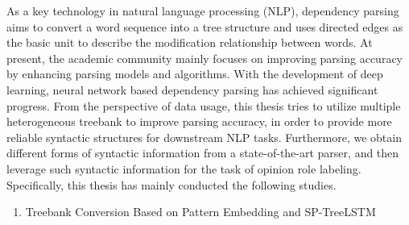 
\begin{eabstract}



    As a key technology in natural language processing (NLP), dependency parsing aims to convert a word sequence into a tree structure and uses directed edges as the basic unit to describe the modification relationship between words.
    At present, the academic community mainly focuses on improving parsing accuracy  by enhancing parsing models and algorithms. With the development of deep learning, neural network based dependency parsing has achieved significant progress.
    From the perspective of data usage, this thesis tries to utilize multiple heterogeneous treebank to improve parsing accuracy,  in order to provide more reliable syntactic structures for downstream NLP  tasks.
    Furthermore, we obtain different forms of syntactic information from a state-of-the-art parser, and then leverage such syntactic information for the task of opinion role labeling.
    Specifically, this thesis has mainly conducted the following studies.

    \begin{enumerate}
        \item  Treebank Conversion Based on Pattern Embedding and SP-TreeLSTM


\end{enumerate}
\end{eabstract}
